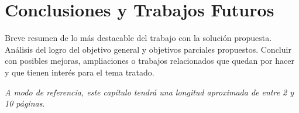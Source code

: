 \chapter{Conclusiones y Trabajos Futuros}
\label{chap:conclusiones}

\noindent
Breve resumen de lo más destacable del trabajo con la solución propuesta. Análisis
del logro del objetivo general y objetivos parciales propuestos. Concluir con
posibles mejoras, ampliaciones o trabajos relacionados que quedan por hacer y
que tienen interés para el tema tratado.

\emph{A modo de referencia, este capítulo tendrá una longitud aproximada de
  entre 2 y 10 páginas}.
